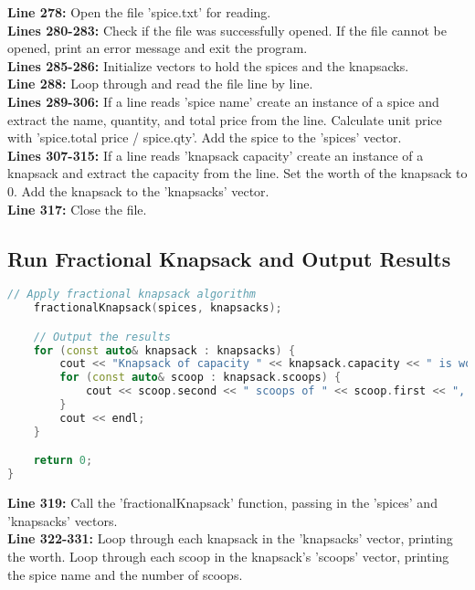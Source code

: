\documentclass[letterpaper, 10pt,DIV=13]{scrartcl}
\numberwithin{equation}{section} %
\numberwithin{figure}{section} %
\numberwithin{table}{section} %
\begin{document}
\textbf{Line 278:} Open the file 'spice.txt' for reading. \\
\textbf{Lines 280-283:} Check if the file was successfully opened. If the file cannot be opened, print an error message and exit the program. \\
\textbf{Lines 285-286:} Initialize vectors to hold the spices and the knapsacks. \\
\textbf{Line 288:} Loop through and read the file line by line. \\
\textbf{Lines 289-306:} If a line reads 'spice name' create an instance of a spice and extract the name, quantity, and total price from the line. Calculate unit price with 'spice.total price / spice.qty'. Add the spice to the 'spices' vector. \\
\textbf{Lines 307-315:} If a line reads 'knapsack capacity' create an instance of a knapsack and extract the capacity from the line. Set the worth of the knapsack to 0. Add the knapsack to the 'knapsacks' vector. \\
\textbf{Line 317:} Close the file.

\subsection{Run Fractional Knapsack and Output Results}
\begin{linenumbers}
\begin{lstlisting}[language=C++, caption={Run Fractional Knapsack and Output Results}, label={code:example}]
    // Apply fractional knapsack algorithm
    fractionalKnapsack(spices, knapsacks);

    // Output the results
    for (const auto& knapsack : knapsacks) {
        cout << "Knapsack of capacity " << knapsack.capacity << " is worth " << knapsack.worth << " quatloos and contains ";
        for (const auto& scoop : knapsack.scoops) {
            cout << scoop.second << " scoops of " << scoop.first << ", ";
        }
        cout << endl;
    }

    return 0;
}
\end{lstlisting}
\end{linenumbers}
\nolinenumbers

\textbf{Line 319:} Call the 'fractionalKnapsack' function, passing in the 'spices' and 'knapsacks' vectors. \\
\textbf{Line 322-331:} Loop through each knapsack in the 'knapsacks' vector, printing the worth. Loop through each scoop in the knapsack's 'scoops' vector, printing the spice name and the number of scoops.
\end{document}
